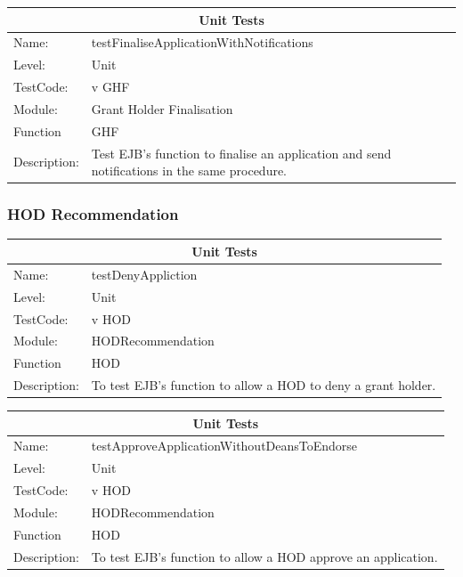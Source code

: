 \documentclass[12pt]{article}
\begin{document}
\begin{center}
\begin{tabular}{|l|p{12cm}|}
\hline
\multicolumn{2}{|c|}{\bf Unit Tests} \\
\hline
 Name: & testFinaliseApplicationWithNotifications  \\
\hline
Level: & Unit \\
\hline
TestCode: & v GHF \\
\hline
Module:& Grant Holder Finalisation \\
\hline
Function & GHF \\
\hline
Description: & Test EJB's function to finalise an application and send notifications in the same procedure. \\
\hline
\end{tabular}
\end{center}

\subsubsection{HOD Recommendation}

\begin{center}
\begin{tabular}{|l|p{12cm}|}
\hline
\multicolumn{2}{|c|}{\bf Unit Tests} \\
\hline
 Name: & testDenyAppliction  \\
\hline
Level: & Unit \\
\hline
TestCode: & v HOD \\
\hline
Module:& HODRecommendation \\
\hline
Function & HOD \\
\hline
Description: & To test EJB's function to allow a HOD to deny a grant holder. \\
\hline
\end{tabular}
\end{center}


\begin{center}
\begin{tabular}{|l|p{12cm}|}
\hline
\multicolumn{2}{|c|}{\bf Unit Tests} \\
\hline
 Name: & testApproveApplicationWithoutDeansToEndorse  \\
\hline
Level: & Unit \\
\hline
TestCode: & v HOD \\
\hline
Module:& HODRecommendation \\
\hline
Function & HOD \\
\hline
Description: & To test EJB's function to allow a HOD approve an application. \\
\hline
\end{tabular}
\end{center}
\end{document}
